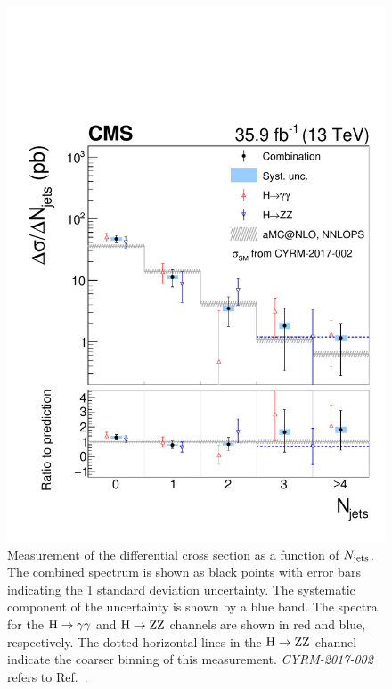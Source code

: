\begin{figure}[hbtp]
  \begin{center}
    \includegraphics[width=0.49\linewidth]{img/differentials/spectra_njets.pdf}
    \caption{
        Measurement of the differential cross section as a function of $N_\text{jets} $. The combined spectrum is shown as black points with error bars indicating the 1 standard deviation uncertainty. The systematic component of the uncertainty is shown by a blue band. The spectra for the $\mathrm{H}\to\mathrm{\gamma}\mathrm{\gamma}$ and $\mathrm{H}\to\mathrm{Z}\mathrm{Z}$ channels are shown in red and blue, respectively.
        The dotted horizontal lines in the $\mathrm{H}\to\mathrm{Z}\mathrm{Z}$ channel indicate the coarser binning of this measurement.
        \textit{CYRM-2017-002} refers to Ref.~\cite{deFlorian:2016spz}.
        }
    \label{fig:CombinedSpectra_njets}
  \end{center}
\end{figure}

